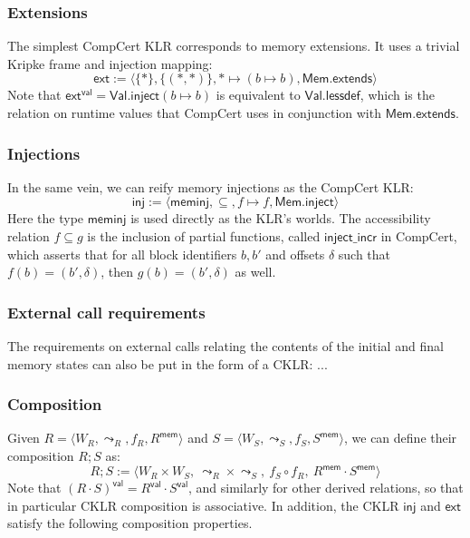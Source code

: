 \documentclass[acmsmall,timestamp,review,anonymous]{acmart}
\newcommand{\kw}[1]{\ensuremath{ \mathsf{#1} }}
\begin{document}
\subsubsection{Extensions}

The simplest CompCert KLR corresponds to memory extensions.
It uses a trivial Kripke frame and injection mapping:
\[
  \kw{ext} :=
    \langle \{*\}, \{(*,*)\}, * \mapsto (b \mapsto b), \kw{Mem.extends} \rangle
\]
Note that $\kw{ext}^\kw{val} = \kw{Val.inject}(b \mapsto b)$
is equivalent to $\kw{Val.lessdef}$,
which is the relation on runtime values that
CompCert uses in conjunction with \kw{Mem.extends}.

\subsubsection{Injections}

In the same vein,
we can reify memory injections as the CompCert KLR:
\[
  \kw{inj} :=
    \langle
      \kw{meminj},
      {\subseteq}, %
      f \mapsto f,
      \kw{Mem.inject}
    \rangle
\]
Here the type \kw{meminj} is used directly
as the KLR's worlds.
The accessibility relation $f \subseteq g$
is the inclusion of partial functions,
called $\kw{inject\_incr}$ in CompCert,
which asserts that for all block identifiers $b, b'$ and offsets $\delta$
such that $f(b) = (b', \delta)$,
then $g(b) = (b', \delta)$ as well.

\subsubsection{External call requirements}

The requirements on external calls
relating the contents of the initial and final memory states
can also be put in the form of a CKLR:
...

\subsubsection{Composition}

Given
$R = \langle W_R, {\leadsto}_R, f_R, R^\kw{mem} \rangle$ and
$S = \langle W_S, {\leadsto}_S, f_S, S^\kw{mem} \rangle$,
we can define
their composition $R ; S$ as:
\[
  R ; S := \langle
    W_R \times W_S, \:
    {\leadsto}_R \times {\leadsto}_S, \:
    f_S \circ f_R, \:
    R^\kw{mem} \cdot S^\kw{mem}
  \rangle
\]
Note that
$(R \cdot S)^\kw{val} = R^\kw{val} \cdot S^\kw{val}$,
and similarly for other derived relations,
so that in particular CKLR composition is associative.
In addition, the CKLR \kw{inj} and \kw{ext}
satisfy the following composition properties.
\end{document}
